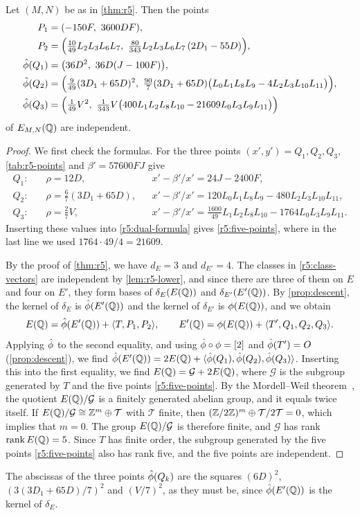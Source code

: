 \begin{proposition}\label{prop:r5-five-points}
Let $(M,N)$ be as in \cref{thm:r5}. Then the points
\begin{equation}\label{r5:five-points}
\begin{aligned}
P_1&=(-150F,\ 3600DF),\\
P_2&=\Big(\tfrac{10}{49}L_2L_3L_6L_7,\ \tfrac{80}{343}L_2L_3L_6L_7\,(2D_1-55D)\Big),\\
\dual(Q_1)&=\big(36D^2,\ 36D(J-100F)\big),\\
\dual(Q_2)&=\Big(\tfrac9{49}(3D_1+65D)^2,\ \tfrac{90}7(3D_1+65D)\big(L_0L_1L_8L_9-4L_2L_3L_{10}L_{11}\big)\Big),\\
\dual(Q_3)&=\Big(\tfrac1{49}V^2,\ \tfrac1{343}V\big(400L_1L_2L_8L_{10}-21609L_0L_3L_9L_{11}\big)\Big)
\end{aligned}
\end{equation}
of $E_{M,N}(\mathbb Q)$ are independent.
\end{proposition}

\begin{proof}
We first check the formulas. For the three points $(x',y')=Q_1,Q_2,Q_3$, \cref{tab:r5-points} and $\beta'=57600FJ$ give
\[
\begin{aligned}
Q_1:&\quad \rho=12D, && x'-\beta'/x'=24J-2400F,\\
Q_2:&\quad \rho=\tfrac67(3D_1+65D), && x'-\beta'/x'=120L_0L_1L_8L_9-480L_2L_3L_{10}L_{11},\\
Q_3:&\quad \rho=\tfrac27V, && x'-\beta'/x'=\tfrac{1600}{49}L_1L_2L_8L_{10}-1764L_0L_3L_9L_{11}.
\end{aligned}
\]
Inserting these values into \eqref{r5:dual-formula} gives \eqref{r5:five-points}, where in the last line we used $1764\cdot49/4=21609$.

By the proof of \cref{thm:r5}, we have $d_E=3$ and $d_{E'}=4$. The classes in \eqref{r5:class-vectors} are independent by \cref{lem:r5-lower}, and since there are three of them on $E$ and four on $E'$, they form bases of $\delta_E(E(\mathbb Q))$ and $\delta_{E'}(E'(\mathbb Q))$. By \cref{prop:descent}, the kernel of $\delta_E$ is $\hat\phi(E'(\mathbb Q))$ and the kernel of $\delta_{E'}$ is $\phi(E(\mathbb Q))$, and we obtain
\[
E(\mathbb Q)=\hat\phi(E'(\mathbb Q))+\langle T,P_1,P_2\rangle,\qquad
E'(\mathbb Q)=\phi(E(\mathbb Q))+\langle T',Q_1,Q_2,Q_3\rangle.
\]
Applying $\hat\phi$ to the second equality, and using $\hat\phi\circ\phi=[2]$ and $\hat\phi(T')=O$ (\cref{prop:descent}), we find $\hat\phi(E'(\mathbb Q))=2E(\mathbb Q)+\langle\hat\phi(Q_1),\hat\phi(Q_2),\hat\phi(Q_3)\rangle$. Inserting this into the first equality, we find $E(\mathbb Q)=\mathcal G+2E(\mathbb Q)$, where $\mathcal G$ is the subgroup generated by $T$ and the five points \eqref{r5:five-points}. By the Mordell--Weil theorem~\cite[Theorem~VIII.6.7]{SilvermanAEC}, the quotient $E(\mathbb Q)/\mathcal G$ is a finitely generated abelian group, and it equals twice itself.
If $E(\mathbb Q)/\mathcal G\cong\mathbb Z^m\oplus\mathcal T$ with $\mathcal T$ finite, then $(\mathbb Z/2\mathbb Z)^m\oplus\mathcal T/2\mathcal T=0$, which implies that $m=0$. The group $E(\mathbb Q)/\mathcal G$ is therefore finite, and $\mathcal G$ has rank $\operatorname{rank} E(\mathbb Q)=5$. Since $T$ has finite order, the subgroup generated by the five points \eqref{r5:five-points} also has rank five, and the five points are independent.
\end{proof}

The abscissas of the three points $\hat\phi(Q_k)$ are the squares $(6D)^2$, $(3(3D_1+65D)/7)^2$ and $(V/7)^2$, as they must be, since $\hat\phi(E'(\mathbb Q))$ is the kernel of $\delta_E$.
